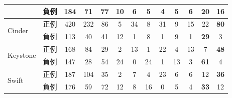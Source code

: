 \documentclass[T,J]{fose} %
\begin{document}
\begin{table}[]
{\begin{tabular}{l|l|c|c|c|cc|cc|cc|cc}
                                            & 負例                                         & 184                                       & 71                                          & 77                                           & 10        & 6          & 5         & 4          & 5         & 6          & {\textbf{20}}         & 16        \\ \hline
\multirow{2}{*}{Cinder}                     & 正例                                         & 420                                       & 232                                         & 86                                           & 5         & 34         & 8         & 31         & 9         & 15         & 22         & {\textbf{80}}        \\
                                            & 負例                                         & 113                                       & 40                                          & 41                                           & 12        & 1          & 8         & 1          & 9         & 1          & {\textbf{29}}         & 3         \\ \hline
\multirow{2}{*}{Keystone}                   & 正例                                         & 168                                       & 84                                          & 29                                           & 2         & 13         & 1         & 22         & 4         & 13         & 7          & {\textbf{48}}        \\
                                            & 負例                                         & 147                                       & 28                                          & 54                                           & 24        & 0          & 24        & 1          & 13        & 3          & {\textbf{61}}         & 4         \\ \hline
\multirow{2}{*}{Swift}                      & 正例                                         & 187                                       & 104                                         & 35                                           & 2         & 7          & 4         & 23         & 6         & 6          & 12         & {\textbf{36}}        \\
                                            & 負例                                         & 176                                       & 59                                          & 72                                           & 12        & 8          & 16        & 0          & 5         & 4          & {\textbf{33}}         & 12        \\ \hline

\end{tabular}}
\end{table}
\end{document}
